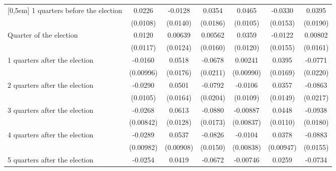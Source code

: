 \begin{table}[!ht]
\begin{tabular}{l*{6}{c}}
[0,5em]
 1 quarters before the election&      0.0226\sym{*}  &     -0.0128         &      0.0354         &      0.0465\sym{***}&     -0.0330\sym{*}  &      0.0395\sym{*}  \\
                    &    (0.0108)         &    (0.0140)         &    (0.0186)         &    (0.0105)         &    (0.0153)         &    (0.0190)         \\
[0,5em]
Quarter of the election&      0.0120         &     0.00639         &     0.00562         &      0.0359\sym{**} &     -0.0122         &     0.00802         \\
                    &    (0.0117)         &    (0.0124)         &    (0.0160)         &    (0.0120)         &    (0.0155)         &    (0.0161)         \\
[0,5em]
 1 quarters after the election&     -0.0160         &      0.0518\sym{**} &     -0.0678\sym{**} &     0.00241         &      0.0395\sym{*}  &     -0.0771\sym{***}\\
                    &   (0.00996)         &    (0.0176)         &    (0.0211)         &   (0.00990)         &    (0.0169)         &    (0.0220)         \\
[0,5em]
 2 quarters after the election&     -0.0290\sym{**} &      0.0501\sym{**} &     -0.0792\sym{***}&     -0.0106         &      0.0357\sym{*}  &     -0.0863\sym{***}\\
                    &    (0.0105)         &    (0.0164)         &    (0.0204)         &    (0.0109)         &    (0.0149)         &    (0.0217)         \\
[0,5em]
 3 quarters after the election&     -0.0268\sym{**} &      0.0613\sym{***}&     -0.0880\sym{***}&    -0.00887         &      0.0448\sym{***}&     -0.0938\sym{***}\\
                    &   (0.00842)         &    (0.0128)         &    (0.0173)         &   (0.00837)         &    (0.0110)         &    (0.0180)         \\
[0,5em]
 4 quarters after the election&     -0.0289\sym{**} &      0.0537\sym{***}&     -0.0826\sym{***}&     -0.0104         &      0.0378\sym{***}&     -0.0883\sym{***}\\
                    &   (0.00982)         &   (0.00908)         &    (0.0150)         &   (0.00838)         &   (0.00947)         &    (0.0155)         \\
[0,5em]
 5 quarters after the election&     -0.0254\sym{*}  &      0.0419\sym{**} &     -0.0672\sym{***}&    -0.00746         &      0.0259\sym{*}  &     -0.0734\sym{***}\\

\end{tabular}
\end{table}
